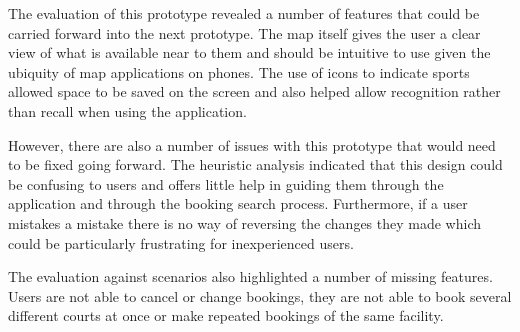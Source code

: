 The evaluation of this prototype revealed a number of features that could be
carried forward into the next prototype. The map itself gives the user a clear
view of what is available near to them and should be intuitive to use given the
ubiquity of map applications on phones. The use of icons to indicate sports
allowed space to be saved on the screen and also helped allow recognition
rather than recall when using the application.

However, there are also a number of issues with this prototype that would need
to be fixed going forward. The heuristic analysis indicated that this design
could be confusing to users and offers little help in guiding them through the
application and through the booking search process. Furthermore, if a user
mistakes a mistake there is no way of reversing the changes they made which
could be particularly frustrating for inexperienced users.

The evaluation against scenarios also highlighted a number of missing features.
Users are not able to cancel or change bookings, they are not able to book
several different courts at once or make repeated bookings of the same
facility.

\restoregeometry%
